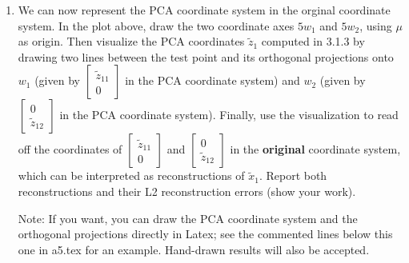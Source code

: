 \documentclass{article}
\def\blu#1{{\color{blu}#1}}
\begin{document}
\begin{enumerate}
  \item We can now represent the PCA coordinate system in the orginal coordinate system. \blu{In the plot above, draw the two coordinate axes $5w_1$ and $5w_2$, using $\mu$ as origin. Then visualize the PCA coordinates $\tilde{z}_1$ computed in 3.1.3 by drawing two lines between the test point and its orthogonal projections onto $w_1$ (given by $\begin{bmatrix} \tilde{z}_{11} \\ 0 \end{bmatrix}$ in the PCA coordinate system) and $w_2$ (given by $\begin{bmatrix} 0 \\ \tilde{z}_{12} \end{bmatrix}$ in the PCA coordinate system). Finally, use the visualization to read off the coordinates of $\begin{bmatrix} \tilde{z}_{11} \\ 0 \end{bmatrix}$ and $\begin{bmatrix} 0 \\ \tilde{z}_{12} \end{bmatrix}$ in the {\bf original} coordinate system, which can be interpreted as reconstructions of $\tilde{x}_1$. Report both reconstructions and their L2 reconstruction errors (show your work).}
  
   Note: If you want, you can draw the PCA coordinate system and the orthogonal projections directly in Latex; see the commented lines below this one in a5.tex for an example. Hand-drawn results will also be accepted.
   
%
%
%


\end{enumerate}
\pagebreak
\end{document}
